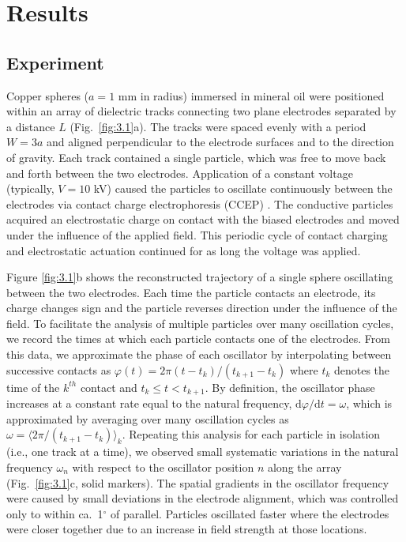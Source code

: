 

\section{Results}

\subsection{Experiment}

Copper spheres ($a = 1$ mm in radius) immersed in mineral oil were positioned within an array of dielectric tracks connecting two plane electrodes separated by a distance $L$ (Fig.~\ref{fig:3.1}a). The tracks were spaced evenly with a period $W=3a$ and aligned perpendicular to the electrode surfaces and to the direction of gravity. Each track contained a single particle, which was free to move back and forth between the two electrodes. Application of a constant voltage (typically, $V=10$ kV) caused the particles to oscillate continuously between the electrodes via contact charge electrophoresis (CCEP) \autocite{bishop2018contact, drews2015contact}. The conductive particles acquired an electrostatic charge on contact with the biased electrodes and moved under the influence of the applied field. This periodic cycle of contact charging and electrostatic actuation continued for as long the voltage was applied.


Figure \ref{fig:3.1}b shows the reconstructed trajectory of a single sphere oscillating between the two electrodes. Each time the particle contacts an electrode, its charge changes sign and the particle reverses direction under the influence of the field. To facilitate the analysis of multiple particles over many oscillation cycles, we record the times at which each particle contacts one of the electrodes.  From this data, we approximate the phase of each oscillator by interpolating between successive contacts as $\varphi(t) = 2\pi (t-t_k)/ (t_{k+1}-t_{k})$ where $t_k$ denotes the time of the $k^{th}$ contact and $t_k \leq t < t_{k+1}$. By definition, the oscillator phase increases at a constant rate equal to the natural frequency, $\mathrm{d}\varphi/\mathrm{d}t = \omega$, which is approximated by averaging over many oscillation cycles as $\omega = \langle 2\pi/(t_{k+1}-t_{k}) \rangle_k$. Repeating this analysis for each particle in isolation (i.e., one track at a time), we observed small systematic variations in the natural frequency $\omega_n$ with respect to the oscillator position $n$ along the array (Fig.~\ref{fig:3.1}c, solid markers). The spatial gradients in the oscillator frequency were caused by small deviations in the electrode alignment,  which was controlled only to within ca.~1$^\circ$ of parallel. Particles oscillated faster where the electrodes were closer together due to an increase in field strength at those locations.
        
